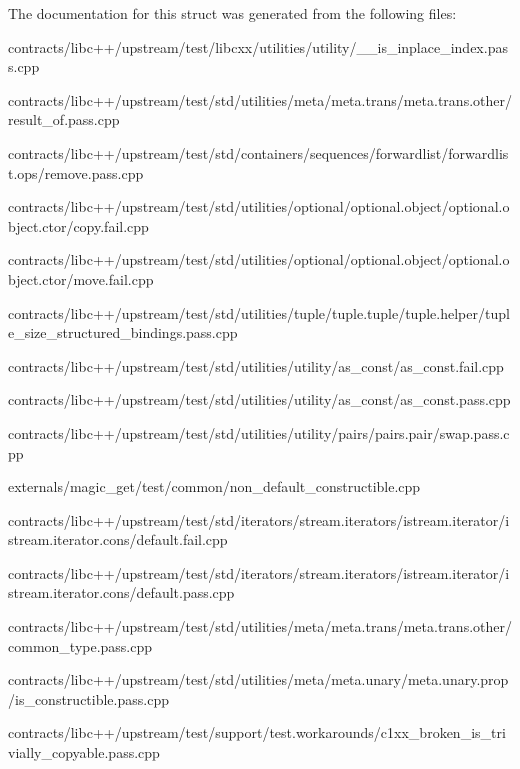 The documentation for this struct was generated from the following files\+:\begin{DoxyCompactItemize}
\item 
contracts/libc++/upstream/test/libcxx/utilities/utility/\+\_\+\+\_\+is\+\_\+inplace\+\_\+index.\+pass.\+cpp\item 
contracts/libc++/upstream/test/std/utilities/meta/meta.\+trans/meta.\+trans.\+other/result\+\_\+of.\+pass.\+cpp\item 
contracts/libc++/upstream/test/std/containers/sequences/forwardlist/forwardlist.\+ops/remove.\+pass.\+cpp\item 
contracts/libc++/upstream/test/std/utilities/optional/optional.\+object/optional.\+object.\+ctor/copy.\+fail.\+cpp\item 
contracts/libc++/upstream/test/std/utilities/optional/optional.\+object/optional.\+object.\+ctor/move.\+fail.\+cpp\item 
contracts/libc++/upstream/test/std/utilities/tuple/tuple.\+tuple/tuple.\+helper/tuple\+\_\+size\+\_\+structured\+\_\+bindings.\+pass.\+cpp\item 
contracts/libc++/upstream/test/std/utilities/utility/as\+\_\+const/as\+\_\+const.\+fail.\+cpp\item 
contracts/libc++/upstream/test/std/utilities/utility/as\+\_\+const/as\+\_\+const.\+pass.\+cpp\item 
contracts/libc++/upstream/test/std/utilities/utility/pairs/pairs.\+pair/swap.\+pass.\+cpp\item 
externals/magic\+\_\+get/test/common/non\+\_\+default\+\_\+constructible.\+cpp\item 
contracts/libc++/upstream/test/std/iterators/stream.\+iterators/istream.\+iterator/istream.\+iterator.\+cons/default.\+fail.\+cpp\item 
contracts/libc++/upstream/test/std/iterators/stream.\+iterators/istream.\+iterator/istream.\+iterator.\+cons/default.\+pass.\+cpp\item 
contracts/libc++/upstream/test/std/utilities/meta/meta.\+trans/meta.\+trans.\+other/common\+\_\+type.\+pass.\+cpp\item 
contracts/libc++/upstream/test/std/utilities/meta/meta.\+unary/meta.\+unary.\+prop/is\+\_\+constructible.\+pass.\+cpp\item 
contracts/libc++/upstream/test/support/test.\+workarounds/c1xx\+\_\+broken\+\_\+is\+\_\+trivially\+\_\+copyable.\+pass.\+cpp\end{DoxyCompactItemize}
